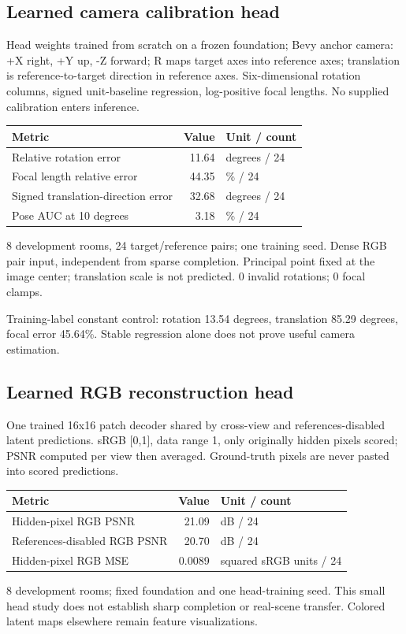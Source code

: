 \documentclass[10pt]{article}
\begin{document}
\subsection{Learned camera calibration head}
Head weights trained from scratch on a frozen foundation; Bevy anchor camera: +X right, +Y up, -Z forward; R maps target axes into reference axes; translation is reference-to-target direction in reference axes. Six-dimensional rotation columns, signed unit-baseline regression, log-positive focal lengths. No supplied calibration enters inference.
\begin{center}\begin{tabular}{p{.57\linewidth}rp{.23\linewidth}}\toprule Metric & Value & Unit / count \\ \midrule
Relative rotation error & 11.64 & degrees / 24 \\
Focal length relative error & 44.35 & \% / 24 \\
Signed translation-direction error & 32.68 & degrees / 24 \\
Pose AUC at 10 degrees & 3.18 & \% / 24 \\
\bottomrule\end{tabular}\end{center}
8 development rooms, 24 target/reference pairs; one training seed. Dense RGB pair input, independent from sparse completion. Principal point fixed at the image center; translation scale is not predicted. 0 invalid rotations; 0 focal clamps.

Training-label constant control: rotation 13.54 degrees, translation 85.29 degrees, focal error 45.64\%. Stable regression alone does not prove useful camera estimation.

\subsection{Learned RGB reconstruction head}
One trained 16x16 patch decoder shared by cross-view and references-disabled latent predictions. sRGB [0,1], data range 1, only originally hidden pixels scored; PSNR computed per view then averaged. Ground-truth pixels are never pasted into scored predictions.
\begin{center}\begin{tabular}{p{.57\linewidth}rp{.23\linewidth}}\toprule Metric & Value & Unit / count \\ \midrule
Hidden-pixel RGB PSNR & 21.09 & dB / 24 \\
References-disabled RGB PSNR & 20.70 & dB / 24 \\
Hidden-pixel RGB MSE & 0.0089 & squared sRGB units / 24 \\
\bottomrule\end{tabular}\end{center}
8 development rooms; fixed foundation and one head-training seed. This small head study does not establish sharp completion or real-scene transfer. Colored latent maps elsewhere remain feature visualizations.
\end{document}
